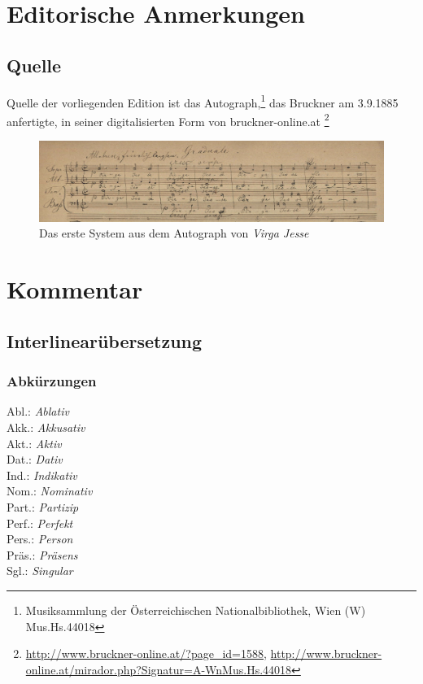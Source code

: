 \documentclass[a4paper]{book}
\begin{document}
\section{Editorische Anmerkungen}

\subsection{Quelle}

Quelle der vorliegenden Edition ist das Autograph,\footnote{Musiksammlung der Österreichischen Nationalbibliothek, Wien (W) Mus.Hs.44018} das Bruckner am 3.9.1885 anfertigte, in seiner digitalisierten Form von bruckner-online.at \footnote{\url{http://www.bruckner-online.at/?page_id=1588}, \url{http://www.bruckner-online.at/mirador.php?Signatur=A-WnMus.Hs.44018}}

\begin{figure}[h]
\includegraphics[width=\textwidth]{Graduale_First_System.png}
\caption{Das erste System aus dem Autograph von \emph{Virga Jesse}}
\end{figure}

\section{Kommentar}

\subsection{Interlinearübersetzung}

\begin{center}

\end{center}

\subsubsection{Abkürzungen}
\begin{multicols}{4}
  \noindent Abl.: \textit{Ablativ} \\
  Akk.: \textit{Akkusativ} \\
  Akt.: \textit{Aktiv} \\
  Dat.: \textit{Dativ} \\
  Ind.: \textit{Indikativ} \\
  Nom.: \textit{Nominativ} \\
  Part.: \textit{Partizip} \\
  Perf.: \textit{Perfekt} \\
  Pers.: \textit{Person} \\
  Präs.: \textit{Präsens} \\
  Sgl.: \textit{Singular} \\
\end{multicols} 
\end{document}
